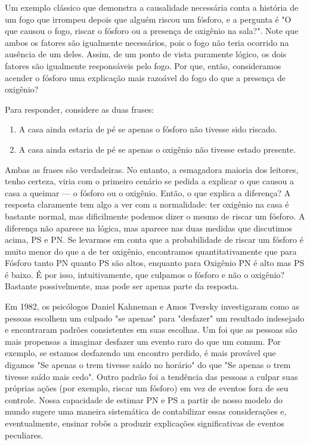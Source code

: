 \documentclass[11pt,a5paper,twoside]{book}
\begin{document}
Um exemplo clássico que demonstra a causalidade necessária conta a história de um fogo que irrompeu depois que alguém riscou um fósforo, e a pergunta é "O que causou o fogo, riscar o fósforo ou a presença de oxigênio na sala?". Note que ambos os fatores são igualmente necessários, pois o fogo não teria ocorrido na ausência de um deles. Assim, de um ponto de vista puramente lógico, os dois fatores são igualmente responsáveis pelo fogo. Por que, então, consideramos acender o fósforo uma explicação mais razoável do fogo do que a presença de oxigênio?

Para responder, considere as duas frases:

\begin{enumerate}
\item A casa ainda estaria de pé se apenas o fósforo não tivesse sido riscado.
\item A casa ainda estaria de pé se apenas o oxigênio não tivesse estado presente.
\end{enumerate}
Ambas as frases são verdadeiras. No entanto, a esmagadora maioria dos leitores, tenho certeza, viria com o primeiro cenário se pedida a explicar o que causou a casa a queimar — o fósforo ou o oxigênio. Então, o que explica a diferença? A resposta claramente tem algo a ver com a normalidade: ter oxigênio na casa é bastante normal, mas dificilmente podemos dizer o mesmo de riscar um fósforo. A diferença não aparece na lógica, mas aparece nas duas medidas que discutimos acima, PS e PN. Se levarmos em conta que a probabilidade de riscar um fósforo é muito menor do que a de ter oxigênio, encontramos quantitativamente que para Fósforo tanto PN quanto PS são altos, enquanto para Oxigênio PN é alto mas PS é baixo. É por isso, intuitivamente, que culpamos o fósforo e não o oxigênio? Bastante possivelmente, mas pode ser apenas parte da resposta.

Em 1982, os psicólogos Daniel Kahneman e Amos Tversky investigaram como as pessoas escolhem um culpado "se apenas" para "desfazer" um resultado indesejado e encontraram padrões consistentes em suas escolhas. Um foi que as pessoas são mais propensas a imaginar desfazer um evento raro do que um comum. Por exemplo, se estamos desfazendo um encontro perdido, é mais provável que digamos "Se apenas o trem tivesse saído no horário" do que "Se apenas o trem tivesse saído mais cedo". Outro padrão foi a tendência das pessoas a culpar suas próprias ações (por exemplo, riscar um fósforo) em vez de eventos fora de seu controle. Nossa capacidade de estimar PN e PS a partir de nosso modelo do mundo sugere uma maneira sistemática de contabilizar essas considerações e, eventualmente, ensinar robôs a produzir explicações significativas de eventos peculiares.
\end{document}
